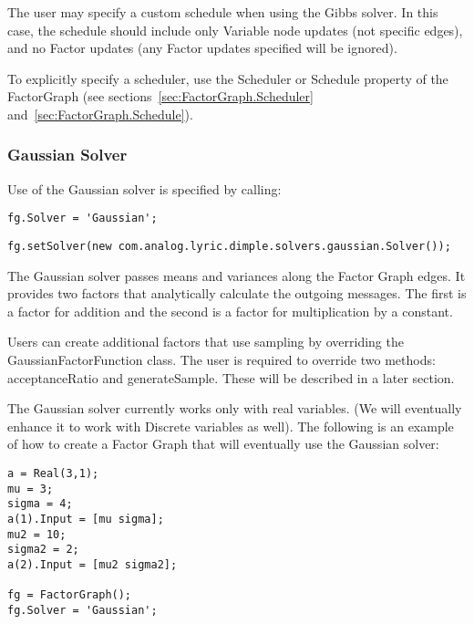 The user may specify a custom schedule when using the Gibbs solver.  In this case, the schedule should include only Variable node updates (not specific edges), and no Factor updates (any Factor updates specified will be ignored).

To explicitly specify a scheduler, use the Scheduler or Schedule property of the FactorGraph (see sections~\ref{sec:FactorGraph.Scheduler} and~\ref{sec:FactorGraph.Schedule}).



\subsubsection{Gaussian Solver}

Use of the Gaussian solver is specified by calling:

\ifmatlab
\begin{lstlisting}
fg.Solver = 'Gaussian';
\end{lstlisting}
\fi

\ifmatlab
\begin{lstlisting}
fg.setSolver(new com.analog.lyric.dimple.solvers.gaussian.Solver());
\end{lstlisting}
\fi



The Gaussian solver passes means and variances along the Factor Graph edges. It provides two factors that analytically calculate the outgoing messages. The first is a factor for addition and the second is a factor for multiplication by a constant.

Users can create additional factors that use sampling by overriding the GaussianFactorFunction class. The user is required to override two methods: acceptanceRatio and generateSample. These will be described in a later section.


The Gaussian solver currently works only with real variables. (We will eventually enhance it to work with Discrete variables as well). The following is an example of how to create a Factor Graph that will eventually use the Gaussian solver:

\ifmatlab
\begin{lstlisting}
a = Real(3,1);
mu = 3;
sigma = 4;
a(1).Input = [mu sigma];  
mu2 = 10;
sigma2 = 2;
a(2).Input = [mu2 sigma2];

fg = FactorGraph();
fg.Solver = 'Gaussian';
\end{lstlisting}
\fi

